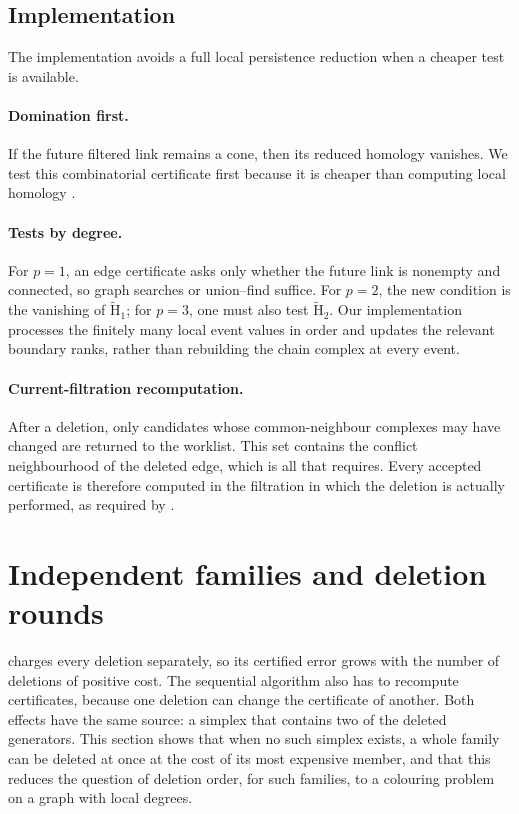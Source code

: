 \documentclass[11pt,letterpaper]{article}
\theoremstyle{definition}
\newcommand{\redH}{\widetilde{\mathrm H}}
\begin{document}
\subsection{Implementation}

The implementation avoids a full local persistence reduction when a cheaper
test is available.

\paragraph{Domination first.}
If the future filtered link remains a cone, then its reduced homology
vanishes. We test this combinatorial certificate first because it is cheaper
than computing local homology
\cite{BoissonnatPritamPareek2018,BoissonnatPritam2020}.

\paragraph{Tests by degree.}
For $p=1$, an edge certificate asks only whether the future link is nonempty
and connected, so graph searches or union--find suffice. For $p=2$, the new
condition is the vanishing of $\redH_1$; for $p=3$, one must also test
$\redH_2$. Our implementation processes the finitely many local event values
in order and updates the relevant boundary ranks, rather than rebuilding the
chain complex at every event.

\paragraph{Current-filtration recomputation.}
After a deletion, only candidates whose common-neighbour complexes may have
changed are returned to the worklist. This set contains the conflict
neighbourhood of the deleted edge, which is all that 
requires. Every accepted certificate is therefore computed in the filtration
in which the deletion is actually performed, as required by
.

\section{Independent families and deletion rounds}
\label{sec:batch}

 charges every deletion separately, so its
certified error grows with the number of deletions of positive cost. The
sequential algorithm also has to recompute certificates, because one deletion
can change the certificate of another. Both effects have the same source: a
simplex that contains two of the deleted generators. This section shows that
when no such simplex exists, a whole family can be deleted at once at the cost
of its most expensive member, and that this reduces the question of deletion
order, for such families, to a colouring problem on a graph with local
degrees.
\end{document}
